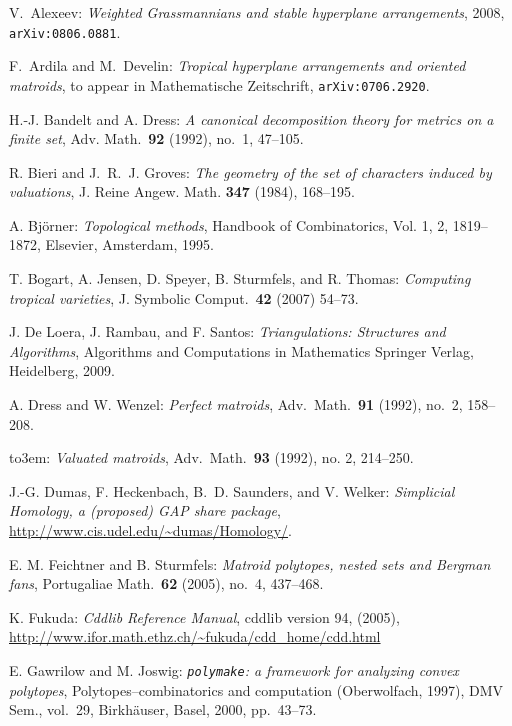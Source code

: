 \documentclass[12pt,a4paper]{amsart}
\theoremstyle{definition}
\providecommand\polymake{\texttt{polymake}\xspace}
\providecommand{\bysame}{\leavevmode\hbox to3em{\hrulefill}\thinspace}
\begin{document}
\begin{thebibliography}{2}

  V.~Alexeev: \emph{Weighted Grassmannians and stable hyperplane arrangements}, 2008, \texttt{arXiv:0806.0881}.

 F.~Ardila and M.~Develin: \emph{Tropical hyperplane
    arrangements and oriented matroids}, to appear in Mathematische
  Zeitschrift, \texttt{arXiv:0706.2920}.

 H.-J. Bandelt and A. Dress: \emph{A canonical
    decomposition theory for metrics on a finite set}, Adv. Math.\ \textbf{92} (1992), no.~1, 47--105.

 R. Bieri and J.~R.~J. Groves: \emph{The geometry of the
    set of characters induced by valuations}, J. Reine Angew. Math.
  \textbf{347} (1984), 168--195.

 A. Bj\"orner: \emph{Topological methods}, Handbook of
  Combinatorics, Vol. 1, 2, 1819--1872, Elsevier, Amsterdam, 1995.

  T. Bogart, A. Jensen, D. Speyer, B. Sturmfels, and R.
  Thomas: \emph{Computing tropical varieties}, J.  Symbolic
  Comput.\ \textbf{42} (2007) 54--73.
    
 J. De Loera, J. Rambau, and F. Santos:
  \emph{Triangulations: Structures and Algorithms}, Algorithms and
  Computations in Mathematics Springer Verlag, Heidelberg, 2009.

 A. Dress and W. Wenzel: \emph{Perfect matroids},
  Adv.\ Math.\ \textbf{91} (1992), no.~2, 158--208.

  \bysame: \emph{Valuated matroids}, Adv.\ Math.\
  \textbf{93} (1992), no. 2, 214--250.

 J.-G. Dumas, F. Heckenbach, B.~D. Saunders, and V.
  Welker: \emph{Simplicial Homology, a (proposed) GAP share package},
    \url{http://www.cis.udel.edu/~dumas/Homology/}.

  E. M. Feichtner and B. Sturmfels: \emph{Matroid polytopes, nested sets and
  Bergman fans}, Portugaliae Math.\ \textbf{62} (2005), no.~4, 437--468.

  K. Fukuda: \emph{Cddlib Reference Manual}, cddlib version 94, (2005),\\
  \url{http://www.ifor.math.ethz.ch/~fukuda/cdd_home/cdd.html}

E. Gawrilow and M. Joswig: \emph{\polymake: a framework for
  analyzing convex polytopes}, Polytopes--combinatorics and computation
  (Oberwolfach, 1997), DMV Sem., vol.~29, Birkh{\"a}user, Basel, 2000,
  pp.~43--73.


\end{thebibliography}
\end{document}
